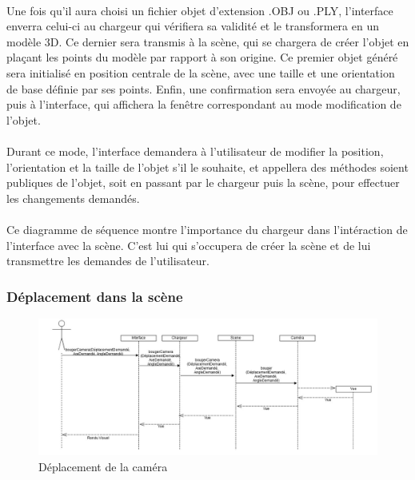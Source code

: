 \paragraph{}
Une fois qu'il aura choisi un fichier objet d'extension .OBJ ou .PLY, l'interface enverra celui-ci au chargeur qui vérifiera sa validité et le transformera en un modèle 3D. Ce dernier sera transmis à la scène, qui se chargera de créer l'objet en plaçant les points du modèle par rapport à son origine. Ce premier objet généré sera initialisé en position centrale de la scène, avec une taille et une orientation de base définie par ses points. Enfin, une confirmation sera envoyée au chargeur, puis à l'interface, qui affichera la fenêtre correspondant au mode modification de l'objet.

\paragraph{}
Durant ce mode, l'interface demandera à l'utilisateur de modifier la position, l'orientation et la taille de l'objet s'il le souhaite, et appellera des méthodes soient publiques de l'objet, soit en passant par le chargeur puis la scène, pour effectuer les changements demandés.

\paragraph{}
Ce diagramme de séquence montre l'importance du chargeur dans l'intéraction de l'interface avec la scène. C'est lui qui s'occupera de créer la scène et de lui transmettre les demandes de l'utilisateur.


\subsubsection{Déplacement dans la scène}

\begin{figure}[h]
		\centering
		\includegraphics[scale=0.40]{bougerCamera.jpg}
		\caption{\label{fig:deplacementCam} Déplacement de la caméra}
\end{figure}

